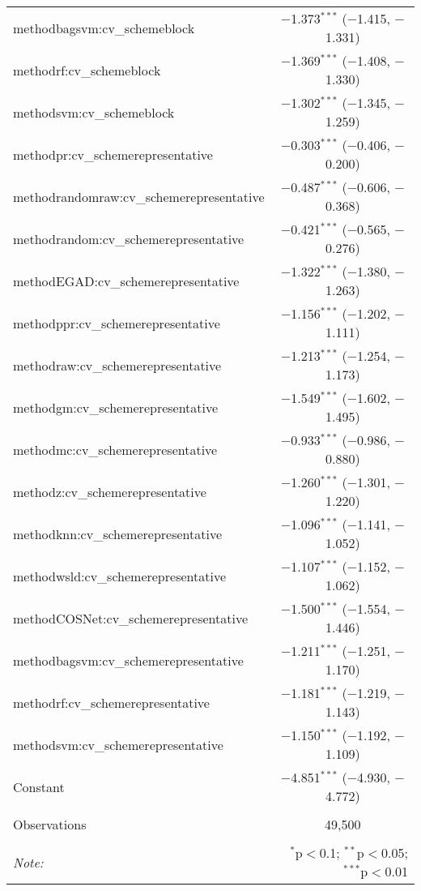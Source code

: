 \begin{table}[!htbp]
\begin{tabular}{@{\extracolsep{5pt}}lc}
  methodbagsvm:cv\_schemeblock & $-$1.373$^{***}$ ($-$1.415, $-$1.331) \\ 
  methodrf:cv\_schemeblock & $-$1.369$^{***}$ ($-$1.408, $-$1.330) \\ 
  methodsvm:cv\_schemeblock & $-$1.302$^{***}$ ($-$1.345, $-$1.259) \\ 
  methodpr:cv\_schemerepresentative & $-$0.303$^{***}$ ($-$0.406, $-$0.200) \\ 
  methodrandomraw:cv\_schemerepresentative & $-$0.487$^{***}$ ($-$0.606, $-$0.368) \\ 
  methodrandom:cv\_schemerepresentative & $-$0.421$^{***}$ ($-$0.565, $-$0.276) \\ 
  methodEGAD:cv\_schemerepresentative & $-$1.322$^{***}$ ($-$1.380, $-$1.263) \\ 
  methodppr:cv\_schemerepresentative & $-$1.156$^{***}$ ($-$1.202, $-$1.111) \\ 
  methodraw:cv\_schemerepresentative & $-$1.213$^{***}$ ($-$1.254, $-$1.173) \\ 
  methodgm:cv\_schemerepresentative & $-$1.549$^{***}$ ($-$1.602, $-$1.495) \\ 
  methodmc:cv\_schemerepresentative & $-$0.933$^{***}$ ($-$0.986, $-$0.880) \\ 
  methodz:cv\_schemerepresentative & $-$1.260$^{***}$ ($-$1.301, $-$1.220) \\ 
  methodknn:cv\_schemerepresentative & $-$1.096$^{***}$ ($-$1.141, $-$1.052) \\ 
  methodwsld:cv\_schemerepresentative & $-$1.107$^{***}$ ($-$1.152, $-$1.062) \\ 
  methodCOSNet:cv\_schemerepresentative & $-$1.500$^{***}$ ($-$1.554, $-$1.446) \\ 
  methodbagsvm:cv\_schemerepresentative & $-$1.211$^{***}$ ($-$1.251, $-$1.170) \\ 
  methodrf:cv\_schemerepresentative & $-$1.181$^{***}$ ($-$1.219, $-$1.143) \\ 
  methodsvm:cv\_schemerepresentative & $-$1.150$^{***}$ ($-$1.192, $-$1.109) \\ 
  Constant & $-$4.851$^{***}$ ($-$4.930, $-$4.772) \\ 
 \hline \\[-1.8ex] 
Observations & 49,500 \\ 
\hline 
\hline \\[-1.8ex] 
\textit{Note:}  & \multicolumn{1}{r}{$^{*}$p$<$0.1; $^{**}$p$<$0.05; $^{***}$p$<$0.01} \\ 
\end{tabular} 
\end{table} 

